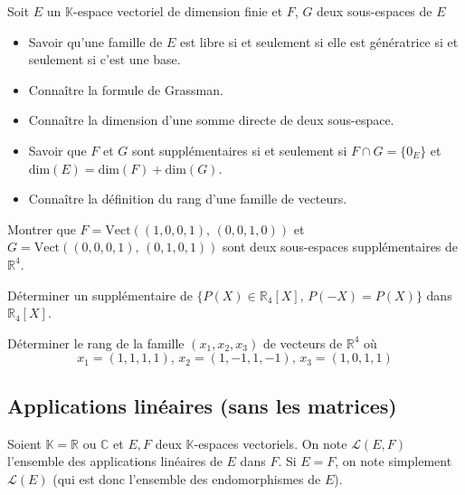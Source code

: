 \documentclass[a4paper,twoside,french,11pt]{VcCours}
\begin{document}
\begin{ptc}{}
	Soit $E$ un $\mathbb{K}$-espace vectoriel de dimension finie et $F$, $G$ deux sous-espaces de $E$
\begin{itemize}
\item Savoir qu'une famille de $E$ est libre si et seulement si elle est génératrice si et seulement si c'est une base.
\item Connaître la formule de Grassman.
\item Connaître la dimension d'une somme directe de deux sous-espace.
\item Savoir que $F$ et $G$ sont supplémentaires si et seulement si $F \cap G = \lbrace 0_E \rbrace$ et $\textrm{dim}(E)= \textrm{dim}(F) + \textrm{dim}(G)$.
\item Connaître la définition du rang d'une famille de vecteurs.
\end{itemize}
\end{ptc}

\begin{Exercice}{}
Montrer que $F=\textrm{Vect}((1,0,0,1), \, (0,0,1,0))$ et $G=\textrm{Vect}((0,0,0,1), \, (0,1,0,1))$ sont deux sous-espaces supplémentaires de $\mathbb{R}^4$.
\end{Exercice} 

\begin{Exercice}{}
  Déterminer un supplémentaire de $\lbrace P(X) \in \mathbb{R}_4[X], \, P(-X)=P(X)\rbrace$ dans $\mathbb{R}_4[X]$.
\end{Exercice} 

\begin{Exercice}{}
  Déterminer le rang de la famille $(x_1,x_2,x_3)$ de vecteurs de $\mathbb{R}^4$ où
  $$ x_1 = (1,1,1,1), \, x_2 = (1, - 1,1, - 1), \, x_3 = (1,0,1,1)$$
\end{Exercice} 
  
\subsection{Applications linéaires (sans les matrices)}

Soient $\mathbb{K}= \mathbb{R}$ ou $\mathbb{C}$ et $E, F$ deux $\mathbb{K}$-espaces vectoriels. On note $\mathcal{L}(E,F)$ l'ensemble des applications linéaires de $E$ dans $F$. Si $E=F$, on note simplement $\mathcal{L}(E)$ (qui est donc l'ensemble des endomorphismes de $E$).
\end{document}
